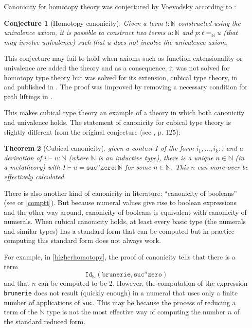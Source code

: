 \documentclass[12pt,a4paper,twoside,xetex]{book}
\newtheorem{theorem}{Theorem}[section]
\newtheorem{conjecture}[theorem]{Conjecture}
\newcommand{\op}[1]{\mathtt{#1}}
\begin{document}
Canonicity for homotopy theory was conjectured by Voevodsky according to 
\cite{Brunerie2018}:

\begin{conjecture}[Homotopy canonicity]
Given a term $t: \mathbb{N}$ constructed using the univalence axiom, it is 
possible to 
construct two terms $u : \mathbb{N}$ and $p : t =_{\mathbb{N}} u$ (that may 
involve univalence) such that $u$ 
does not involve the univalence axiom.
\end{conjecture}

This conjecture may fail to hold when axioms such as function extensionality or 
univalence are added the theory and as a consequence, it was not solved for 
homotopy type theory but was solved for its extension, cubical type theory, in 
\cite{Huber2016} and published in \cite{Huber2017}. The proof was improved by 
removing a necessary condition for path liftings in
\cite{Coquand2019}.  



This makes cubical type 
theory an example of a theory 
in which both canonicity and univalence holds. The statement of canonicity for 
cubical type theory is slightly different from the original conjecture (see 
\cite{Huber2016}, p. 125): 

\begin{theorem}[Cubical canonicity]\label{canonicity}
given a context $I$ of the form $i_1, ..., i_k : \mathbb{I}$ and a derivation 
of 
$i \vdash u : \mathbb{N}$ (where $\mathbb{N}$ is an inductive type), there is a 
unique $n \in \mathbb{N}$ (in a metatheory) with $I \vdash u = \op{suc}^n 
\op{zero} : \mathbb{N}$ for some $n \in \mathbb{N}$. This $n$ can more-over be 
effectively calculated. 
\end{theorem}

There is also another kind of 
canonicity in literature: ``canonicity of booleans'' (see \cite{Angiuli2018} 
or \cref{comptt}). But 
because numeral values give rise to boolean expressions and the other way 
around, canonicity of booleans is equivalent with canonicity of numerals. When 
cubical canonicity holds, at least every basic type (the numerals and similar 
types) has a standard form that can be computed but in practice computing 
this standard form does not always work.

For example, in \cref{higherhomotopy}, 
the proof of canonicity tells that there is a term 
$$\texttt{Id}_{\mathbb{N}}(\texttt{brunerie}, \texttt{suc}^n 
\texttt{zero})$$ and that  $n$ can be computed to be $2$. However, the 
computation of the expression \texttt{brunerie} does not result (quickly 
enough) in a numeral that uses only a finite number of applications of 
\texttt{suc}. This may be because the process of reducing a term of the 
$\mathbb{N}$ type is not the most effective way of computing the number $n$ of 
the standard reduced form. 
\end{document}

